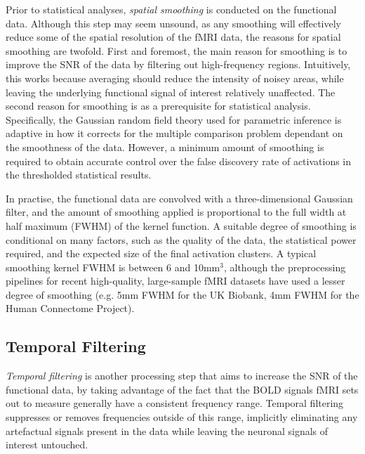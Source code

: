 Prior to statistical analyses, \textit{spatial smoothing} is conducted on the functional data. Although this step may seem unsound, as any smoothing will effectively reduce some of the spatial resolution of the fMRI data, the reasons for spatial smoothing are twofold. First and foremost, the  main reason for smoothing is to improve the SNR of the data by filtering out high-frequency regions. Intuitively, this works because averaging should reduce the intensity of noisey areas, while leaving the underlying functional signal of interest relatively unaffected. The second reason for smoothing is as a prerequisite for statistical analysis. Specifically, the Gaussian random field theory used for parametric inference is adaptive in how it corrects for the multiple comparison problem dependant on the smoothness of the data. However, a minimum amount of smoothing is required to obtain accurate control over the false discovery rate of activations in the thresholded statistical results.

In practise, the functional data are convolved with a three-dimensional Gaussian filter, and the amount of smoothing applied is proportional to the full width at half maximum (FWHM) of the kernel function. A suitable degree of smoothing is conditional on many factors, such as the quality of the data, the statistical power required, and the expected size of the final activation clusters. A typical smoothing kernel FWHM is between 6 and 10mm$^{3}$, although the preprocessing pipelines for recent high-quality, large-sample fMRI datasets have used a lesser degree of smoothing (e.g. 5mm FWHM for the UK Biobank, 4mm FWHM for the Human Connectome Project). 
 

\subsection{Temporal Filtering}
\label{sec:temporal_filtering}

\textit{Temporal filtering} is another processing step that aims to increase the SNR of the functional data, by taking advantage of the fact that the BOLD signals fMRI sets out to measure generally have a consistent frequency range. Temporal filtering suppresses or removes frequencies outside of this range, implicitly eliminating any artefactual signals present in the data while leaving the neuronal signals of interest untouched.

